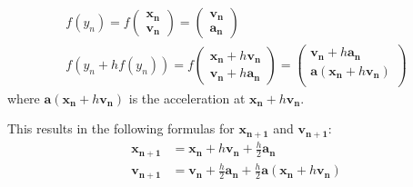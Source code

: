 \documentclass[a4paper,10pt,openany]{article}
\begin{document}
\begin{align}
f(y_n) = f \begin{pmatrix} \mathbf{x_n}\\ \mathbf{v_n} \end{pmatrix} = \begin{pmatrix} \mathbf{v_n}\\ \mathbf{a_n} \end{pmatrix}\\
f(y_n + h f(y_n) ) = f \begin{pmatrix} \mathbf{x_n} + h\mathbf{v_n} \\ \mathbf{v_n} + h \mathbf{a_n} \end{pmatrix} = \begin{pmatrix}  \mathbf{v_n} + h \mathbf{a_n} \\ \mathbf{a} (\mathbf{x_n} + h\mathbf{v_n}) \\ \end{pmatrix}
\end{align}
where $\mathbf{a} (\mathbf{x_n} + h\mathbf{v_n})$ is the acceleration at $\mathbf{x_n} + h\mathbf{v_n}$.

This results in the following formulas for $\mathbf{x_{n+1}}$ and  $\mathbf{v_{n+1}}$:
\begin{align}
\mathbf{x_{n+1}} &= \mathbf{x_n} +  h\mathbf{v_n} +  \frac{h}{2} \mathbf{a_n}\\
\mathbf{v_{n+1}} &= \mathbf{v_n} +  \frac{h}{2} \mathbf{a_n} + \frac{h}{2} \mathbf{a} (\mathbf{x_n} + h\mathbf{v_n})
\end{align}
\end{document}
